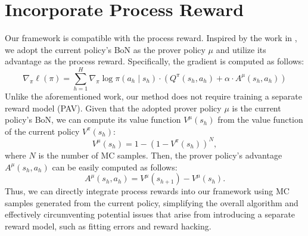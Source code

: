 \section{Incorporate Process Reward}
\label{appendix:incorporate_process_reward}

Our framework is compatible with the process reward. Inspired by the work in \cite{setlur2024rewardingprogressscalingautomated}, we adopt the current policy's BoN as the prover policy \(\mu\) and utilize its advantage as the process reward. Specifically, the gradient is computed as follows:
\[
\nabla_{\pi}\ell(\pi)=\sum_{h=1}^{H}\nabla_{\pi}\log\pi(a_h \mid s_h)\cdot\left(Q^{\pi}(s_h,a_h)+\alpha\cdot A^{\mu}(s_h,a_h)\right)
\]
Unlike the aforementioned work, our method does not require training a separate reward model (PAV). Given that the adopted prover policy \(\mu\) is the current policy’s BoN, we can compute its value function \(V^{\mu}(s_h)\) from the value function of the current policy \(V^{\pi}(s_h)\):
\[
V^{\mu}(s_h) = 1 - (1 - V^{\pi}(s_h))^N,
\]
where \(N\) is the number of MC samples. Then, the prover policy’s advantage \(A^{\mu}(s_h,a_h)\) can be easily computed as follows:
\[
A^{\mu}(s_h,a_h) = V^{\mu}(s_{h+1}) - V^{\mu}(s_h).
\]
Thus, we can directly integrate process rewards into our framework using MC samples generated from the current policy, simplifying the overall algorithm and effectively circumventing potential issues that arise from introducing a separate reward model, such as fitting errors and reward hacking.